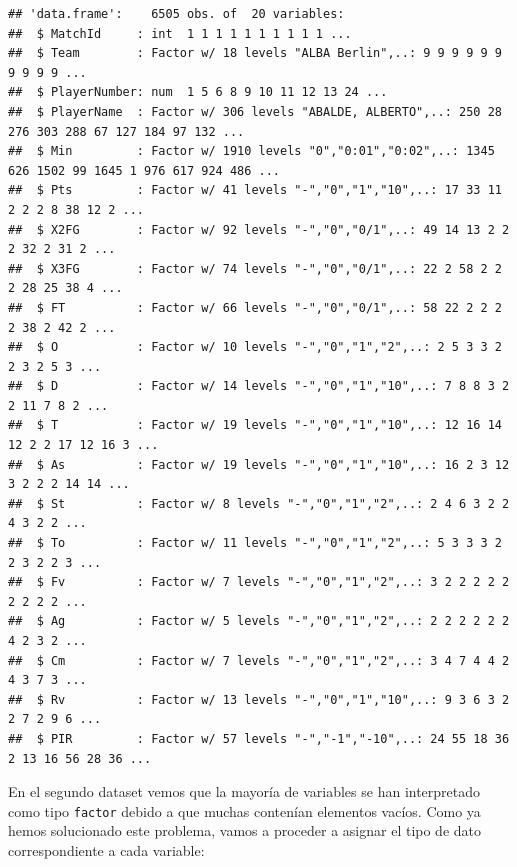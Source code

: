 \documentclass[
]{article}
\begin{document}
\begin{verbatim}
## 'data.frame':    6505 obs. of  20 variables:
##  $ MatchId     : int  1 1 1 1 1 1 1 1 1 1 ...
##  $ Team        : Factor w/ 18 levels "ALBA Berlin",..: 9 9 9 9 9 9 9 9 9 9 ...
##  $ PlayerNumber: num  1 5 6 8 9 10 11 12 13 24 ...
##  $ PlayerName  : Factor w/ 306 levels "ABALDE, ALBERTO",..: 250 28 276 303 288 67 127 184 97 132 ...
##  $ Min         : Factor w/ 1910 levels "0","0:01","0:02",..: 1345 626 1502 99 1645 1 976 617 924 486 ...
##  $ Pts         : Factor w/ 41 levels "-","0","1","10",..: 17 33 11 2 2 2 8 38 12 2 ...
##  $ X2FG        : Factor w/ 92 levels "-","0","0/1",..: 49 14 13 2 2 2 32 2 31 2 ...
##  $ X3FG        : Factor w/ 74 levels "-","0","0/1",..: 22 2 58 2 2 2 28 25 38 4 ...
##  $ FT          : Factor w/ 66 levels "-","0","0/1",..: 58 22 2 2 2 2 38 2 42 2 ...
##  $ O           : Factor w/ 10 levels "-","0","1","2",..: 2 5 3 3 2 2 3 2 5 3 ...
##  $ D           : Factor w/ 14 levels "-","0","1","10",..: 7 8 8 3 2 2 11 7 8 2 ...
##  $ T           : Factor w/ 19 levels "-","0","1","10",..: 12 16 14 12 2 2 17 12 16 3 ...
##  $ As          : Factor w/ 19 levels "-","0","1","10",..: 16 2 3 12 3 2 2 2 14 14 ...
##  $ St          : Factor w/ 8 levels "-","0","1","2",..: 2 4 6 3 2 2 4 3 2 2 ...
##  $ To          : Factor w/ 11 levels "-","0","1","2",..: 5 3 3 3 2 2 3 2 2 3 ...
##  $ Fv          : Factor w/ 7 levels "-","0","1","2",..: 3 2 2 2 2 2 2 2 2 2 ...
##  $ Ag          : Factor w/ 5 levels "-","0","1","2",..: 2 2 2 2 2 2 4 2 3 2 ...
##  $ Cm          : Factor w/ 7 levels "-","0","1","2",..: 3 4 7 4 4 2 4 3 7 3 ...
##  $ Rv          : Factor w/ 13 levels "-","0","1","10",..: 9 3 6 3 2 2 7 2 9 6 ...
##  $ PIR         : Factor w/ 57 levels "-","-1","-10",..: 24 55 18 36 2 13 16 56 28 36 ...
\end{verbatim}

\newpage

En el segundo dataset vemos que la mayoría de variables se han
interpretado como tipo \texttt{factor} debido a que muchas contenían
elementos vacíos. Como ya hemos solucionado este problema, vamos a
proceder a asignar el tipo de dato correspondiente a cada variable:
\end{document}
